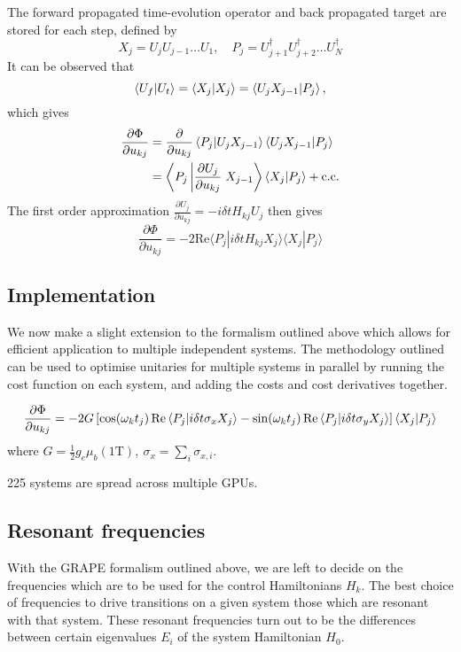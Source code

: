 \documentclass[../Thesis.tex]{subfiles}
\begin{document}
The forward propagated time-evolution operator and back propagated target are stored for each step, defined by
\begin{equation}
    X_j = U_jU_{j-1} \dots U_1,\quad P_j = U_{j+1}^\dagger U_{j+2}^\dagger\dots U_N^\dagger
\end{equation}
It can be observed that 
\begin{equation}
    \bra{U_f}\ket{U_t} = \bra{X_j}\ket{X_j} = \bra{U_j X_{j-1}}\ket{P_j},
\end{equation}
which gives
\begin{align}
    \frac{\partial\Phi}{\partial u_{kj}} &= \frac{\partial}{\partial u_{kj}} \bra{P_j}\ket{U_jX_{j-1}}\bra{U_jX_{j-1}}\ket{P_j}\\
    &= \left\langle P_j\left|\frac{\partial U_j}{\partial u_{kj}}\right. X_{j-1}\right\rangle\bra{X_j}\ket{P_j} + \text{c.c.}
\end{align}
The first order approximation $\frac{\partial U_j}{\partial u_{kj}} = -i\delta t H_{kj}U_j$ then gives
\begin{equation}
      \frac{\partial\Phi}{\partial u_{kj}} = -2\text{Re}\langle P_j | i\delta tH_{kj} X_j\rangle \langle X_j | P_j\rangle
\end{equation}

\subsection{Implementation}
We now make a slight extension to the formalism outlined above which allows for efficient application to multiple independent systems. The methodology outlined can be used to optimise unitaries for multiple systems in parallel by running the cost function on each system, and adding the costs and cost derivatives together.

\begin{equation}
    \frac{\partial \Phi}{\partial u_{kj}}
        = -2G\left[\cos(\omega_k t_j) \Re\bra{P_j}\ket{i\delta t\sigma_x X_j} - \sin(\omega_k t_j)\Re\bra{P_j}\ket{i\delta t\sigma_y X_j}\right]\bra{X_j}\ket{P_j}
\end{equation}
where $G=\frac{1}{2}g_e\mu_b(1 \text{T}),\ \sigma_{x}=\sum_{i}\sigma_{x,i}$.

225 systems are spread across multiple GPUs. 

\subsection{Resonant frequencies}
With the GRAPE formalism outlined above, we are left to decide on the frequencies which are to be used for the control Hamiltonians $H_k$. The best choice of frequencies to drive transitions on a given system those which are resonant with that system. These resonant frequencies turn out to be the differences between certain eigenvalues $E_i$ of the system Hamiltonian $H_0$. 
\end{document}
